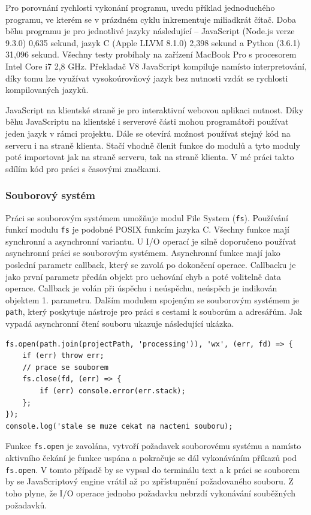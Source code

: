 Pro porovnání rychlosti vykonání programu, uvedu příklad jednoduchého programu, ve kterém se v prázdném cyklu inkrementuje miliadkrát čítač. Doba běhu programu je pro jednotlivé jazyky následující -- JavaScript (Node.js verze 9.3.0) 0,635 sekund, jazyk C (Apple LLVM 8.1.0) 2,398 sekund a Python (3.6.1) 31,096 sekund. Všechny testy probíhaly na zařízení MacBook Pro s procesorem Intel Core i7 2,8 GHz. Překladač V8 JavaScript kompiluje namísto interpretování, díky tomu lze využívat vysokoúrovňový jazyk bez nutnosti vzdát se rychlosti kompilovaných jazyků.\cite{MasteringNodejs}

JavaScript na klientské straně je pro interaktivní webovou aplikaci nutnost. Díky běhu JavaScriptu na klientské i serverové části mohou programátoři používat jeden jazyk v rámci projektu. Dále se otevírá možnost používat stejný kód na serveru i na straně klienta. Stačí vhodně členit funkce do modulů a tyto moduly poté importovat jak na straně serveru, tak na straně klienta. V mé práci takto sdílím kód pro práci s časovými značkami.

\subsubsection{Souborový systém}
Práci se souborovým systémem umožňuje modul File System (\texttt{fs}). Používání funkcí modulu \texttt{fs} je podobné POSIX funkcím jazyka C. Všechny funkce mají synchronní a asynchronní variantu. U I/O operací je silně doporučeno používat asynchronní práci se souborovým systémem. Asynchronní funkce mají jako poslední parametr callback, který se zavolá po dokončení operace. Callbacku je jako první parametr předán objekt pro uchování chyb a poté volitelně data operace. Callback je volán při úspěchu i neúspěchu, neúspěch je indikován objektem 1. parametru. Dalším modulem spojeným se souborovým systémem je \texttt{path}, který poskytuje nástroje pro práci s cestami k souborům a adresářům. Jak vypadá asynchronní čtení souboru ukazuje následující ukázka.
\begin{lstlisting}[style=JavaScript]
fs.open(path.join(projectPath, 'processing')), 'wx', (err, fd) => {
	if (err) throw err;
	// prace se souborem
	fs.close(fd, (err) => {
		if (err) console.error(err.stack);
	};
});
console.log('stale se muze cekat na nacteni souboru);
\end{lstlisting}

Funkce \texttt{fs.open} je zavolána, vytvoří požadavek souborovému systému a namísto aktivního čekání je funkce uspána a pokračuje se dál vykonáváním příkazů pod \texttt{fs.open}. V tomto případě by se vypsal do terminálu text  a k práci se souborem by se JavaScriptový engine vrátil až po zpřístupnění požadovaného souboru. Z toho plyne, že I/O operace jednoho požadavku nebrzdí vykonávání souběžných požadavků.

